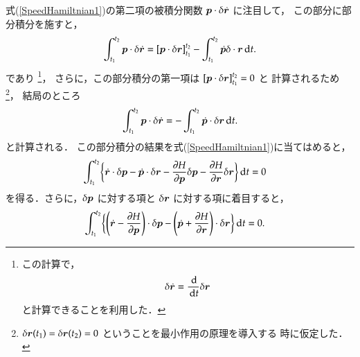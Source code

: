                 式(\ref{SpeedHamiltnian1})の第二項の被積分関数 $\boldsymbol{p} \cdot \delta \dot{\boldsymbol{r}}$ に注目して，
                この部分に部分積分を施すと，
                    \begin{align*}
                          \int_{t_{1}}^{t_{2}} \boldsymbol{p} \cdot \delta \dot{\boldsymbol{r}}
                        = [\boldsymbol{p} \cdot \delta \boldsymbol{r}]_{t_{1}}^{t_{2}}
                          - \int_{t_{1}}^{t_{2}} \dot{\boldsymbol{p}} \delta \cdot \boldsymbol{r} \,\mathrm{d} t.
                    \end{align*}
                であり
                    \footnote{
                        この計算で，
                            \begin{align*}
                                \delta \dot{\boldsymbol{r}} = \frac{\,\mathrm{d}}{\,\mathrm{d} t} \delta \boldsymbol{r}
                            \end{align*}
                        と計算できることを利用した．

                    }，
                さらに，この部分積分の第一項は $[\boldsymbol{p} \cdot \delta \boldsymbol{r}]_{t_{1}}^{t_{2}}=0$ と
                計算されるため
                    \footnote{
                        $\delta \boldsymbol{r}(t_{1}) = \delta  \boldsymbol{r}(t_{2})=0$ ということを最小作用の原理を導入する
                        時に仮定した．
                    }，
                結局のところ
                    \begin{align*}
                          \int_{t_{1}}^{t_{2}} \boldsymbol{p} \cdot \delta \dot{\boldsymbol{r}}
                        =- \int_{t_{1}}^{t_{2}} \dot{\boldsymbol{p}} \cdot \delta \boldsymbol{r} \,\mathrm{d} t.
                    \end{align*}
                と計算される．
                この部分積分の結果を式(\ref{SpeedHamiltnian1})に当てはめると，
                    \begin{align*}
                        \int_{t_{1}}^{t_{2}} \biggl\{
                                                      \dot{\boldsymbol{r}} \cdot \delta \boldsymbol{p}
                                                    - \dot{\boldsymbol{p}} \cdot \delta \boldsymbol{r}
                                                    - \frac{\partial H}{\partial \boldsymbol{p}} \delta \boldsymbol{p}
                                                    - \frac{\partial H}{\partial \boldsymbol{r}} \delta \boldsymbol{r}
                                              \biggr\} \,\mathrm{d} t &= 0
                    \end{align*}
                を得る．さらに，$\delta \boldsymbol{p}$ に対する項と $\delta \boldsymbol{r}$ に対する項に着目すると，
                    \begin{align}\label{SpeedHamiltnian2}
                        \int_{t_{1}}^{t_{2}} \biggl\{
                                                \left(
                                                      \dot{\br} - \frac{\rd H}{\rd \bp}
                                                \right) \cdot \delta \bp
                                                - \left(
                                                      \dot{\bp} + \frac{\rd H}{\rd \br}
                                                \right) \cdot \delta \br
                                              \biggr\} \df t &= 0.
                    \end{align}
